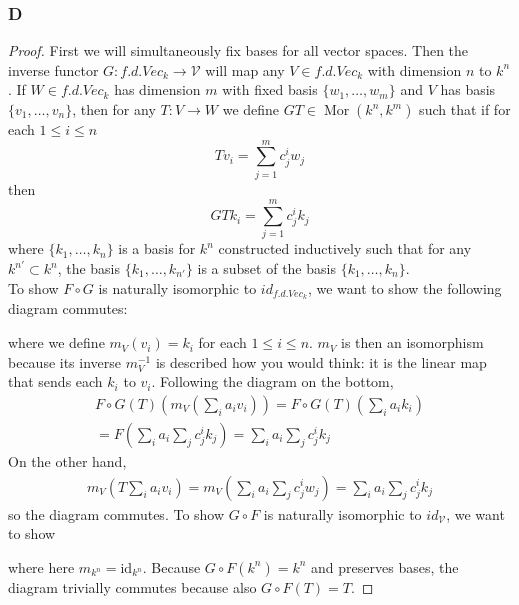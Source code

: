 \documentclass{article}
\newcommand{\id}{\mathrm{id}}
\DeclareMathOperator{\Mor}{Mor}
\begin{document}
\subsubsection{D}\label{1.2.D}
\begin{proof}
    First we will simultaneously fix bases for all vector spaces. Then the inverse functor $G:f.d.Vec_k\to \mathscr V$ will map any $V\in f.d.Vec_k$ with dimension $n$ to $k^n$. If $W\in f.d.Vec_k$ has dimension $m$ with fixed basis $\{w_1,\dots,w_m\}$ and $V$ has basis $\{v_1,\dots,v_n\}$, then for any $T:V\to W$ we define $GT\in \Mor(k^n,k^m)$ such that if for each $1\le i \le n$
    \[
    Tv_i=\sum_{j=1}^m c^i_j w_j
    \]
    then
    \[
    GTk_i=\sum_{j=1}^m c^i_j k_j
    \]
    where $\{k_1,\dots, k_n\}$ is a basis for $k^n$ constructed inductively such that for any $k^{n'}\subset k^n$, the basis $\{k_1,\dots, k_{n'}\}$ is a subset of the basis $\{k_1,\dots, k_n\}$.\\
    \newline
    To show $F\circ G$ is naturally isomorphic to $id_{f.d.Vec_k}$, we want to show the following diagram commutes:
    \begin{center}
    \end{center}
    where we define $m_V(v_i)=k_i$ for each $1\le i\le n$. $m_V$ is then an isomorphism because its inverse $m_V^{-1}$ is described how you would think: it is the linear map that sends each $k_i$ to $v_i$.  Following the diagram on the bottom,
    \begin{align*}
        F\circ G(T)(m_V(\sum_i a_iv_i))=F\circ G(T)(\sum_i a_ik_i)\\
        =F(\sum_i a_i \sum_j c^i_j k_j)=\sum_i a_i \sum_j c^i_j k_j
    \end{align*}
    On the other hand,
    \begin{align*}
        m_V(T\sum_i a_iv_i)=m_V(\sum_i a_i \sum_j c^i_j w_j)=\sum_i a_i \sum_j c^i_jk_j
    \end{align*}
    so the diagram commutes. To show $G\circ F$ is naturally isomorphic to $id_\mathscr V$, we want to show
    \begin{center}
    \end{center}
    where here $m_{k^n}=\id_{k^n}$. Because $G\circ F(k^n)=k^n$ and preserves bases, the diagram trivially commutes because also $G\circ F(T)=T$.
\end{proof}
\end{document}
